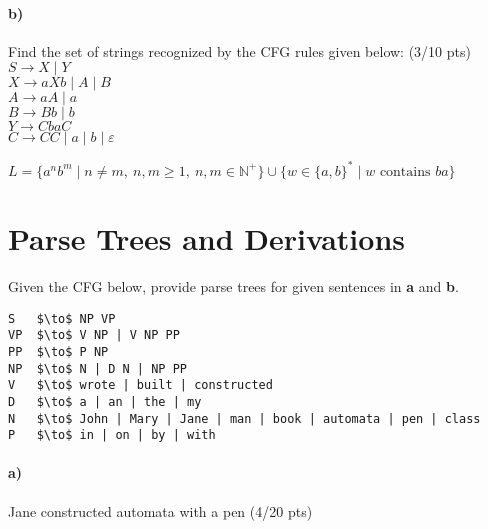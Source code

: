 \documentclass[a4paper,12pt]{article}
\begin{document}
\paragraph{b)} Find the set of strings recognized by the CFG rules given below:         \hfill \small{(3/10 pts)} \\


$S \to X \mid Y$ \\
$X \to aXb \mid A \mid B$ \\
$A \to aA \mid a$ \\
$B \to Bb \mid b$ \\
$Y \to CbaC$ \\
$C \to CC \mid a \mid b \mid \varepsilon$  \\

\begin{tcolorbox}
$
L = \{a^nb^m \mid n \neq m, \ n, m \geq 1, \ n, m \in \mathbb{N}^+\} \cup \{w \in \{a, b\}^* \mid w \text{ contains }ba\}
$
\end{tcolorbox}


\newpage
\section{Parse Trees and Derivations \hfill {}}
Given the CFG below, provide parse trees for given sentences in \textbf{a} and \textbf{b}.\\

\begin{lstlisting}[style=output,mathescape=true]
S   $\to$ NP VP
VP  $\to$ V NP | V NP PP
PP  $\to$ P NP
NP  $\to$ N | D N | NP PP
V   $\to$ wrote | built | constructed
D   $\to$ a | an | the | my
N   $\to$ John | Mary | Jane | man | book | automata | pen | class
P   $\to$ in | on | by | with
\end{lstlisting}

\paragraph{a)} Jane constructed automata with a pen \hfill \small{(4/20 pts)} \\

\begin{tcolorbox}
\end{tcolorbox}
\end{document}
